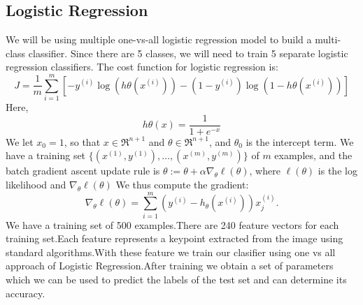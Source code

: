 \documentclass[18pt,letterpaper]{article}
\begin{document}
\subsection{Logistic Regression}
We will be using multiple one-vs-all logistic regression model to build a
multi-class classifier. Since there are 5
classes, we will need to train 5 separate logistic regression classifiers.
The cost function for logistic regression is:$$J=\frac{1}{m}\sum\limits_{i=1}^m[-y^{(i)}\log(h\theta(x^{(i)}))-(1-y^{(i)})\log(1-h\theta(x^{(i)}))]$$
Here,
$$ h\theta(x)=\frac{1}{1 + e^{-x}} $$
We let $ x_0=1 $, so that $x \in \Re^{n+1}$
and $ \theta \in \Re^{n+1} $, and $ \theta_0 $ is the intercept term.  We have a training set
$ \{(x^{(1)}, y^{(1)}), \ldots, (x^{(m)}, y^{(m)})\} $ of $m$ examples, and the batch gradient
ascent update rule is $ \theta := \theta + \alpha \nabla_\theta \ell(\theta) $, where $ \ell(\theta) $
is the log likelihood and $ \nabla_\theta \ell(\theta)$
We thus compute the gradient:
$$
\nabla_\theta \ell(\theta) = \sum_{i=1}^m \left(y^{(i)} - h_\theta(x^{(i)}) \right) x^{(i)}_j.
$$
We have a training set of 500 examples.There are 240 feature vectors for each training set.Each feature represents a keypoint extracted from the image using standard algorithms.With these feature we train our clasifier using one vs all approach of Logistic Regression.After training we obtain a set of parameters which we can be used to predict the labels of the test set and can determine its accuracy.
\end{document}
